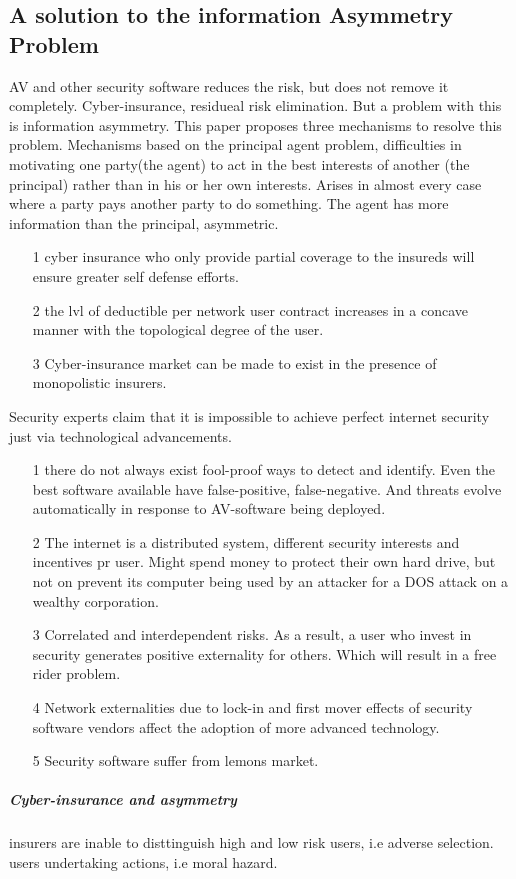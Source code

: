 \subsection{A solution to the information Asymmetry Problem}
AV and other security software reduces the risk, but does not remove it completely. Cyber-insurance,
 residueal risk elimination. But a problem with this is information asymmetry. This paper proposes
  three mechanisms to resolve this problem. Mechanisms based on the principal agent problem,
   difficulties in motivating one party(the agent) to act in the best interests of another 
   (the principal) rather than in his or her own interests. Arises in almost every case where a party
    pays another party to do something. The agent has more information than the principal, asymmetric.
\begin{itemize}
 \item[1] cyber insurance who only provide partial coverage to the insureds will ensure greater self defense efforts.
 \item[2] the lvl of deductible per network user contract increases in a concave manner with the topological degree of the user.
 \item[3] Cyber-insurance market can be made to exist in the presence of monopolistic insurers.
 
\end{itemize} 
Security experts claim that it is impossible to achieve perfect internet security just via technological advancements.
\begin{itemize}
\item[1] there do not always exist fool-proof ways to detect and identify. 
Even the best software available have false-positive, false-negative. And threats evolve automatically in response to AV-software being deployed. 
\item[2] The internet is a distributed system, different security interests and incentives pr user.
 Might spend money to protect their own hard drive, but not on prevent its computer being used by an
  attacker for a DOS attack on a wealthy corporation. 
\item[3] Correlated and interdependent risks. As a result, a user who invest in security generates
 positive externality for others. Which will result in a free rider problem.
\item[4] Network externalities due to lock-in and first mover effects of security software vendors
 affect the adoption of more advanced technology.
\item[5] Security software suffer from lemons market. 
\end{itemize}
 \subparagraph{Cyber-insurance and asymmetry}
 insurers are inable to disttinguish high and low risk users, i.e adverse selection.
 users undertaking actions, i.e moral hazard. 
 

